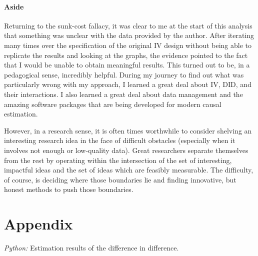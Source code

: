 \documentclass{article}
\begin{document}
\paragraph{Aside}Returning to the sunk-cost fallacy, it was clear to me at the start of this analysis that something was unclear with the data provided by the author. After iterating many times over the specification of the original IV design without being able to replicate the results and looking at the graphs, the evidence pointed to the fact that I would be unable to obtain meaningful results. This turned out to be, in a pedagogical sense, incredibly helpful. During my journey to find out what was particularly wrong with my approach, I learned a great deal about IV, DID, and their interactions. I also learned a great deal about data management and the amazing software packages that are being developed for modern causal estimation.

However, in a research sense, it is often times worthwhile to consider shelving an interesting research idea in the face of difficult obstacles (especially when it involves not enough or low-quality data). Great researchers separate themselves from the rest by operating within the intersection of the set of interesting, impactful ideas and the set of ideas which are feasibly measurable. The difficulty, of course, is deciding where those boundaries lie and finding innovative, but honest methods to push those boundaries.


\newpage
\section*{Appendix}

\begin{table}[!h]
    
    \caption{\label{tab:python-summary}\emph{Python:} Estimation results of the
        difference in difference.}
    \label{table:tab1}
\end{table}
% 

\clearpage
{}
\printbibliography
\end{document}
